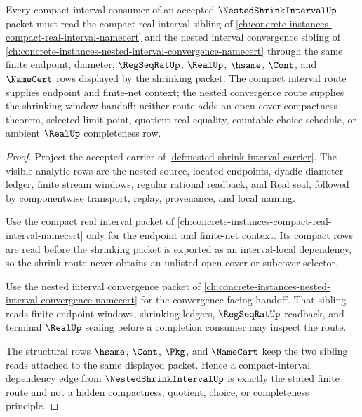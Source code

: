 \begin{theorem}
\label{thm:nested-shrink-interval-compact-interval-route}
Every compact-interval consumer of an accepted $\NestedShrinkIntervalUp$ packet must read the compact real interval sibling of \autoref{ch:concrete-instances-compact-real-interval-namecert} and the nested interval convergence sibling of \autoref{ch:concrete-instances-nested-interval-convergence-namecert} through the same finite endpoint, diameter, $\RegSeqRatUp$, $\RealUp$, $\hsame$, $\Cont$, and $\NameCert$ rows displayed by the shrinking packet. The compact interval route supplies endpoint and finite-net context; the nested convergence route supplies the shrinking-window handoff; neither route adds an open-cover compactness theorem, selected limit point, quotient real equality, countable-choice schedule, or ambient $\RealUp$ completeness row.
\end{theorem}
\begin{proof}
Project the accepted carrier of \autoref{def:nested-shrink-interval-carrier}. The visible analytic rows are the nested source, located endpoints, dyadic diameter ledger, finite stream windows, regular rational readback, and Real seal, followed by componentwise transport, replay, provenance, and local naming.

Use the compact real interval packet of \autoref{ch:concrete-instances-compact-real-interval-namecert} only for the endpoint and finite-net context. Its compact rows are read before the shrinking packet is exported as an interval-local dependency, so the shrink route never obtains an unlisted open-cover or subcover selector.

Use the nested interval convergence packet of \autoref{ch:concrete-instances-nested-interval-convergence-namecert} for the convergence-facing handoff. That sibling reads finite endpoint windows, shrinking ledgers, $\RegSeqRatUp$ readback, and terminal $\RealUp$ sealing before a completion consumer may inspect the route.

The structural rows $\hsame$, $\Cont$, $\Pkg$, and $\NameCert$ keep the two sibling reads attached to the same displayed packet. Hence a compact-interval dependency edge from $\NestedShrinkIntervalUp$ is exactly the stated finite route and not a hidden compactness, quotient, choice, or completeness principle.
\end{proof}
